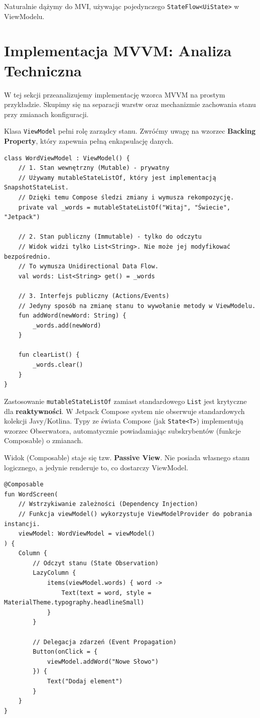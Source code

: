 Naturalnie dążymy do MVI, używając pojedynczego \texttt{StateFlow<UiState>} w ViewModelu.

\section{Implementacja MVVM: Analiza Techniczna}

W tej sekcji przeanalizujemy implementację wzorca MVVM na prostym przykładzie. Skupimy się na separacji warstw oraz mechanizmie zachowania stanu przy zmianach konfiguracji.

Klasa \texttt{ViewModel} pełni rolę zarządcy stanu. Zwróćmy uwagę na wzorzec \textbf{Backing Property}, który zapewnia pełną enkapsulację danych.

\begin{verbatim}
class WordViewModel : ViewModel() {
    // 1. Stan wewnętrzny (Mutable) - prywatny
    // Używamy mutableStateListOf, który jest implementacją SnapshotStateList.
    // Dzięki temu Compose śledzi zmiany i wymusza rekompozycję.
    private val _words = mutableStateListOf("Witaj", "Świecie", "Jetpack")
    
    // 2. Stan publiczny (Immutable) - tylko do odczytu
    // Widok widzi tylko List<String>. Nie może jej modyfikować bezpośrednio.
    // To wymusza Unidirectional Data Flow.
    val words: List<String> get() = _words

    // 3. Interfejs publiczny (Actions/Events)
    // Jedyny sposób na zmianę stanu to wywołanie metody w ViewModelu.
    fun addWord(newWord: String) {
        _words.add(newWord)
    }

    fun clearList() {
        _words.clear()
    }
}
\end{verbatim}

Zastosowanie \texttt{mutableStateListOf} zamiast standardowego \texttt{List} jest krytyczne dla \textbf{reaktywności}. W Jetpack Compose system nie obserwuje standardowych kolekcji Javy/Kotlina. Typy ze świata Compose (jak \texttt{State<T>}) implementują wzorzec Obserwatora, automatycznie powiadamiając subskrybentów (funkcje Composable) o zmianach.

Widok (Composable) staje się tzw. \textbf{Passive View}. Nie posiada własnego stanu logicznego, a jedynie renderuje to, co dostarczy ViewModel.

\begin{verbatim}
@Composable
fun WordScreen(
    // Wstrzykiwanie zależności (Dependency Injection)
    // Funkcja viewModel() wykorzystuje ViewModelProvider do pobrania instancji.
    viewModel: WordViewModel = viewModel()
) {
    Column {
        // Odczyt stanu (State Observation)
        LazyColumn {
            items(viewModel.words) { word ->
                Text(text = word, style = MaterialTheme.typography.headlineSmall)
            }
        }

        // Delegacja zdarzeń (Event Propagation)
        Button(onClick = { 
            viewModel.addWord("Nowe Słowo") 
        }) {
            Text("Dodaj element")
        }
    }
}
\end{verbatim}


